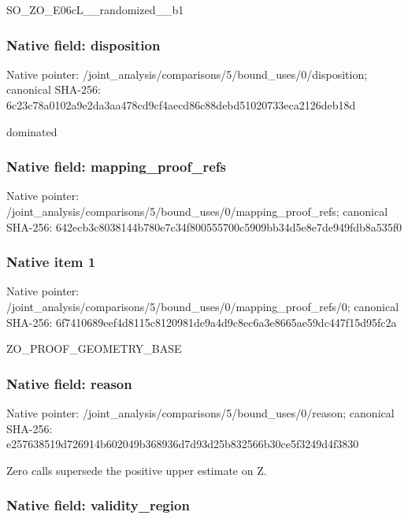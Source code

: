 \documentclass[10pt,a4paper]{article}
\begin{document}
SO\_ZO\_E06cL\_\_randomized\_\_b1


\subsubsection{Native field: disposition}


Native pointer: /joint\_analysis/comparis\allowbreak{}ons/5/bound\_uses/0/dispo\allowbreak{}sition; canonical SHA-256: 6c23c78a0102a9e2da3aa478\allowbreak{}cd9cf4aecd86c88debd51020\allowbreak{}733eca2126deb18d


dominated


\subsubsection{Native field: mapping\_proof\_refs}


Native pointer: /joint\_analysis/comparis\allowbreak{}ons/5/bound\_uses/0/mappi\allowbreak{}ng\_proof\_refs; canonical SHA-256: 642ecb3c8038144b780e7c34\allowbreak{}f800555700c5909bb34d5e8e\allowbreak{}7de949fdb8a535f0



\subsubsection{Native item 1}


Native pointer: /joint\_analysis/comparis\allowbreak{}ons/5/bound\_uses/0/mappi\allowbreak{}ng\_proof\_refs/0; canonical SHA-256: 6f7410689eef4d8115c81209\allowbreak{}81de9a4d9c8ec6a3e8665ae5\allowbreak{}9dc447f15d95fc2a


ZO\_PROOF\_GEOMETRY\_BASE


\subsubsection{Native field: reason}


Native pointer: /joint\_analysis/comparis\allowbreak{}ons/5/bound\_uses/0/reaso\allowbreak{}n; canonical SHA-256: e257638519d726914b602049\allowbreak{}b368936d7d93d25b832566b3\allowbreak{}0ce5f3249d4f3830


Zero calls supersede the positive upper estimate on Z.


\subsubsection{Native field: validity\_region}
\end{document}
